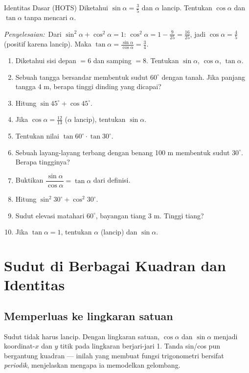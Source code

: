 \documentclass[11pt,a4paper]{report}
\theoremstyle{gaya}
\newcommand{\jawab}{\par\smallskip\noindent\textit{\textcolor{oranye}{Penyelesaian:}}\ }
\begin{document}
\begin{contoh}{Identitas Dasar (HOTS)}
Diketahui $\sin\alpha=\tfrac35$ dan $\alpha$ lancip. Tentukan $\cos\alpha$ dan $\tan\alpha$ tanpa mencari $\alpha$.

\jawab Dari $\sin^2\alpha+\cos^2\alpha=1$: $\cos^2\alpha=1-\tfrac{9}{25}=\tfrac{16}{25}$, jadi $\cos\alpha=\tfrac45$ (positif karena lancip). Maka $\tan\alpha=\tfrac{\sin\alpha}{\cos\alpha}=\tfrac34$.
\end{contoh}

\begin{latihan}
\begin{enumerate}[leftmargin=*]
  \item Diketahui sisi depan $= 6$ dan samping $= 8$. Tentukan $\sin\alpha$, $\cos\alpha$, $\tan\alpha$.
  \item Sebuah tangga bersandar membentuk sudut $60^\circ$ dengan tanah. Jika panjang tangga 4 m, berapa tinggi dinding yang dicapai?
  \item Hitung $\sin45^\circ+\cos45^\circ$.
  \item Jika $\cos\alpha=\tfrac{12}{13}$ ($\alpha$ lancip), tentukan $\sin\alpha$.
  \item Tentukan nilai $\tan60^\circ\cdot\tan30^\circ$.
  \item Sebuah layang-layang terbang dengan benang 100 m membentuk sudut $30^\circ$. Berapa tingginya?
  \item Buktikan $\dfrac{\sin\alpha}{\cos\alpha}=\tan\alpha$ dari definisi.
  \item Hitung $\sin^2 30^\circ+\cos^2 30^\circ$.
  \item Sudut elevasi matahari $60^\circ$, bayangan tiang 3 m. Tinggi tiang?
  \item Jika $\tan\alpha=1$, tentukan $\alpha$ (lancip) dan $\sin\alpha$.
\end{enumerate}
\end{latihan}

\section{Sudut di Berbagai Kuadran dan Identitas}

\subsection*{Memperluas ke lingkaran satuan}
Sudut tidak harus lancip. Dengan lingkaran satuan, $\cos\alpha$ dan $\sin\alpha$ menjadi koordinat-$x$ dan $y$ titik pada lingkaran berjari-jari 1. Tanda sin/cos pun bergantung kuadran --- inilah yang membuat fungsi trigonometri bersifat \emph{periodik}, menjelaskan mengapa ia memodelkan gelombang.
\end{document}

